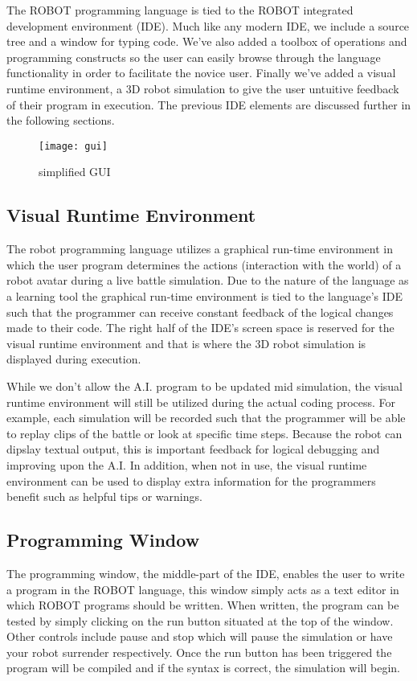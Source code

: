 \documentclass[a4paper]{article}
\begin{document}
The ROBOT programming language is tied to the ROBOT integrated development environment (IDE). Much like any modern IDE, we include a source tree and a window for typing code. We've also added a toolbox of operations and programming constructs so the user can easily browse through the language functionality in order to facilitate the novice user. Finally we've added a visual runtime environment, a 3D robot simulation to give the user untuitive feedback of their program in execution. The previous IDE elements are discussed further in the following sections.

\begin{figure}[h!]
	\centering
	\texttt{[image: gui]}
	\caption{simplified GUI}
\end{figure}

\subsection{Visual Runtime Environment}
        
The robot programming language utilizes a graphical run-time environment in which the user program determines the actions (interaction with the world) of a robot avatar during a live battle simulation. Due to the nature of the language as a learning tool the graphical run-time environment is tied to the language's IDE such that the programmer can receive constant feedback of the logical changes made to their code. The right half of the IDE's screen space is reserved for the visual runtime environment and that is where the 3D robot simulation is displayed during execution.

While we don't allow the A.I. program to be updated mid simulation, the visual runtime environment will still be utilized during the actual coding process. For example, each simulation will be recorded such that the programmer will be able to replay clips of the battle or look at specific time steps. Because the robot can dipslay textual output, this is important feedback for logical debugging and improving upon the A.I. In addition, when not in use, the visual runtime environment can be used to display extra information for the programmers benefit such as helpful tips or warnings.

\subsection{Programming Window}

The programming window, the middle-part of the IDE, enables the user to write a program in the ROBOT language, this window simply acts as a text editor in which ROBOT programs should be written. When written, the program can be tested by simply clicking on the run button situated at the top of the window. Other controls include pause and stop which will pause the simulation or have your robot surrender respectively. Once the run button has been triggered the program will be compiled and if the syntax is correct, the simulation will begin.
\end{document}
